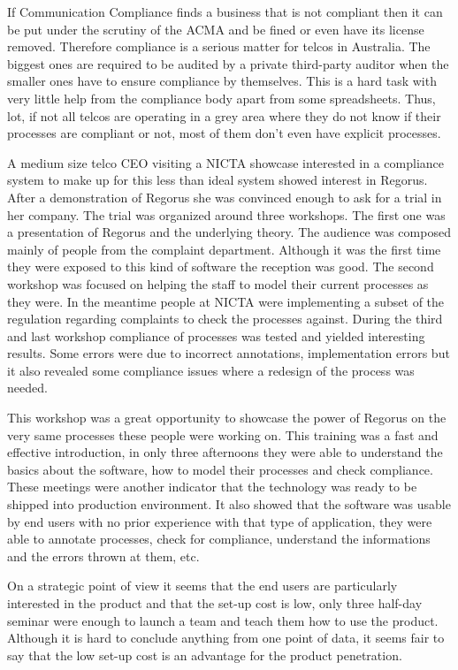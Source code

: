 \documentclass[10pt]{report}
\begin{document}
If Communication Compliance finds a business that is not compliant then it can be put under the scrutiny of the ACMA and be fined or even have its license removed. Therefore compliance is a serious matter for telcos in Australia. The biggest ones are required to be audited by a private third-party auditor when the smaller ones have to ensure compliance by themselves. This is a hard task with very little help from the compliance body apart from some spreadsheets. Thus, lot, if not all telcos are operating in a grey area where they do not know if their processes are compliant or not, most of them don't even have explicit processes.

A medium size telco CEO visiting a NICTA showcase interested in a compliance system to make up for this less than ideal system showed interest in Regorus. After a demonstration of Regorus she was convinced enough to ask for a trial in her company. The trial was organized around three workshops. The first one was a presentation of Regorus and the underlying theory. The audience was composed mainly of people from the complaint department. Although it was the first time they were exposed to this kind of software the reception was good. The second workshop was focused on helping the staff to model their current processes as they were. In the meantime people at NICTA were implementing a subset of the regulation regarding complaints to check the processes against. During the third and last workshop compliance of processes was tested and yielded interesting results. Some errors were due to incorrect annotations, implementation errors but it also revealed some compliance issues where a redesign of the process was needed.

This workshop was a great opportunity to showcase the power of Regorus on the very same processes these people were working on. This training was a fast and effective introduction, in only three afternoons they were able to understand the basics about the software, how to model their processes and check compliance. These meetings were another indicator that the technology was ready to be shipped into production environment. It also showed that the software was usable by end users with no prior experience with that type of application, they were able to annotate processes, check for compliance, understand the informations and the errors thrown at them, etc.

On a strategic point of view it seems that the end users are particularly interested in the product and that the set-up cost is low, only three half-day seminar were enough to launch a team and teach them how to use the product. Although it is hard to conclude anything from one point of data, it seems fair to say that the low set-up cost is an advantage for the product penetration. \\
\end{document}
